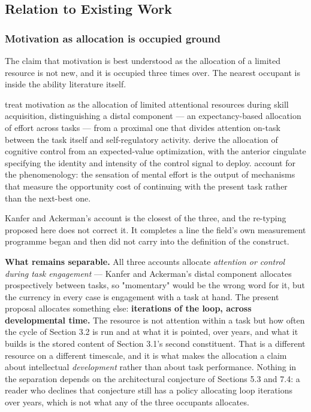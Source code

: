 \documentclass[12pt,a4paper]{article}
\begin{document}
\subsection{Relation to Existing Work}

\subsubsection{Motivation as allocation is occupied ground}

The claim that motivation is best understood as the allocation of a limited resource is not new, and it is occupied three times over. The nearest occupant is inside the ability literature itself.

\textbf{\citet{KanferAckerman1989}} treat motivation as the allocation of limited attentional resources during skill acquisition, distinguishing a distal component ---\hspace{0pt} an expectancy-based allocation of effort across tasks ---\hspace{0pt} from a proximal one that divides attention on-task between the task itself and self-regulatory activity. \textbf{\citet{Shenhav2013}} derive the allocation of cognitive control from an expected-value optimization, with the anterior cingulate specifying the identity and intensity of the control signal to deploy. \textbf{\citet{Kurzban2013}} account for the phenomenology: the sensation of mental effort is the output of mechanisms that measure the opportunity cost of continuing with the present task rather than the next-best one.

Kanfer and Ackerman's account is the closest of the three, and the re-typing proposed here does not correct it. It completes a line the field's own measurement programme began and then did not carry into the definition of the construct.

\textbf{What remains separable.} All three accounts allocate \emph{attention or control during task engagement} ---\hspace{0pt} Kanfer and Ackerman's distal component allocates prospectively between tasks, so "momentary" would be the wrong word for it, but the currency in every case is engagement with a task at hand. The present proposal allocates something else: \textbf{iterations of the loop, across developmental time.} The resource is not attention within a task but how often the cycle of Section 3.2 is run and at what it is pointed, over years, and what it builds is the stored content of Section 3.1's second constituent. That is a different resource on a different timescale, and it is what makes the allocation a claim about intellectual \emph{development} rather than about task performance. Nothing in the separation depends on the architectural conjecture of Sections 5.3 and 7.4: a reader who declines that conjecture still has a policy allocating loop iterations over years, which is not what any of the three occupants allocates.
\end{document}
